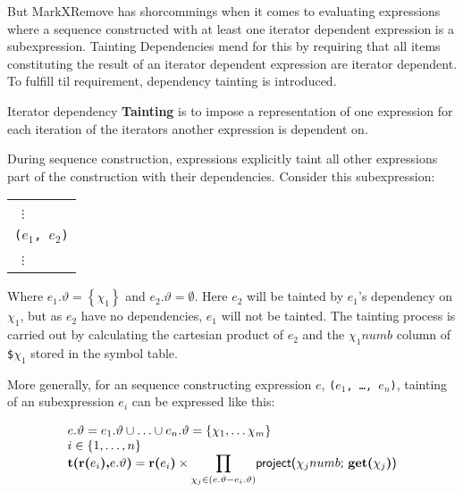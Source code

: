 But MarkXRemove has shorcommings when it comes to evaluating expressions where a sequence constructed with at
least one iterator dependent expression is a subexpression. Tainting Dependencies mend for this by requiring that
all items constituting the result of an iterator dependent expression are iterator dependent. To fulfill til
requirement, dependency tainting is introduced.

\noindent
\begin{myDefinition}
Iterator dependency \textbf{Tainting} is to impose a representation of one expression for each iteration of the
iterators another expression is dependent on.
\end{myDefinition}

During sequence construction, expressions explicitly taint all other expressions part of the construction with
their dependencies. Consider this subexpression:
\begin{center}
\begin{tabular}{l}
\quad \;\, $\vdots$  \\
\texttt{(}$e_{1}$\texttt{, }$e_{2}$\texttt{)}\\
\quad \;\, $\vdots$  
\end{tabular}
\end{center}
Where $e_{1}.\vartheta = \left\{\chi_{1}\right\}$ and $e_{2}.\vartheta = \emptyset$. Here $e_{2}$ will be tainted
by $e_{1}$'s dependency on $\chi_{1}$, but as $e_{2}$ have no dependencies, $e_{1}$ will not be tainted. The
tainting process is carried out by calculating the cartesian product of $e_{2}$ and the $\chi_{1}$$numb$ column of
\texttt{\$}$\chi_{1}$ stored in the symbol table.

More generally, for an sequence constructing expression $e$, \texttt{(}$e_{1}$\texttt{, \ldots, }$e_{n}$\texttt{)},
tainting of an subexpression $e_{i}$ can be expressed like this: 
\begin{center}
\begin{equation}
\begin{array}{l}
e.\vartheta = e_{1}.\vartheta \cup \ldots \cup e_{n}.\vartheta = \left\{\chi_{1},\ldots\chi_{m}\right\} \\
i \in \left\{1,\ldots,n\right\} \\
\mbox{\textbf{t(r(}}e_{i}\mbox{\textbf{),}}e.\vartheta\mbox{\textbf{)}} = 
\mbox{\textbf{r(}}e_{i}\mbox{\textbf{)}} \times {\displaystyle \prod_{\chi_{j} \in (e.\vartheta -
e_{i}.\vartheta)}} \mbox{\textsf{project(}}\chi_{j}numb\mbox{\textsf{;
}\textbf{get(}}\chi_{j}\mbox{\textbf{)}\textsf{)}}
\end{array}
\label{eq:trans:TD:taint}
\end{equation}
\end{center}

